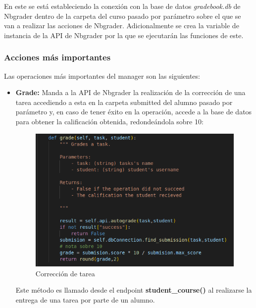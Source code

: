 En este se está estableciendo la conexión con la base de datos \textit{gradebook.db} de Nbgrader dentro de la carpeta del curso pasado por parámetro sobre el que se van a realizar las acciones de Nbgrader. Adicionalmente se crea la variable de instancia de la API de Nbgrader por la que se ejecutarán las funciones de este. 

\subsubsection{Acciones más importantes}
Las operaciones más importantes del manager son las siguientes:

\begin{itemize}
\item \textbf{Grade:} Manda a la API de Nbgrader la realización de la corrección de una tarea accediendo a esta en la carpeta submitted del alumno pasado por parámetro y, en caso de tener éxito en la operación, accede a la base de datos para obtener la calificación obtenida, redondeándola sobre 10:
\begin{figure}[H]
    \centering
    \includegraphics[scale=0.8]{img/imgs-memoria/Grade.PNG}
    \caption{Corrección de tarea}
\end{figure}

Este método es llamado desde el endpoint \textbf{student\_course()} al realizarse la entrega de una tarea por parte de un alumno.


\end{itemize}
